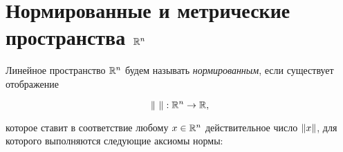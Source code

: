 \documentclass[../../main.tex]{subfiles}
\begin{document}
% 
% 
% 
%  
% 
% 
% 
% 
% 

\section{Нормированные и метрические пространства $\mathbb{R}^n$}

Линейное пространство $\mathbb{R}^n$ будем называть 
\emph{нормированным}, если существует отображение

\begin{equation}
 \label{norm-disp}
 \lVert\ \rVert: \mathbb{R}^n \to \mathbb{R},
\end{equation}

которое ставит в соответствие любому $x \in \mathbb{R}^n$ действительное 
число $\lVert{x}\rVert$, для которого выполняются следующие аксиомы нормы:
\end{document}
